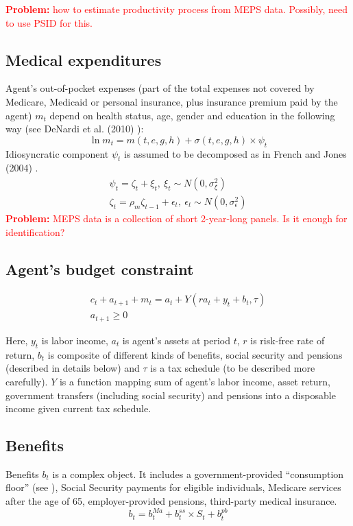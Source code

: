 \documentclass[
10pt, %
a4paper, %
oneside, %
headinclude,footinclude, %
BCOR5mm, %
]{scrartcl}
\begin{document}
 \textcolor{red}{\textbf{Problem:} how to estimate productivity process from MEPS data. Possibly, need to use PSID for this.}

\subsection{Medical expenditures}
Agent's out-of-pocket expenses (part of the total expenses not covered by Medicare, Medicaid or personal insurance, plus insurance premium paid by the agent) $m_t$ depend on health status, age, gender and education in the following way (see DeNardi et al. (2010) \cite{DeNardi2010}):
\begin{equation*}
\ln m_t = m(t,e,g,h) + \sigma(t,e,g,h)\times \psi_t 
\end{equation*}
Idiosyncratic component $\psi_t$ is assumed to be decomposed as in French and Jones (2004) \cite{French2004}.
\begin{eqnarray*}
\psi_t = \zeta_t + \xi_t, \   	\xi_t \sim N(0,\sigma_\xi^2) \\
\zeta_t = \rho_m\zeta_{t-1} + \epsilon_t, \   \epsilon_t \sim N(0,\sigma_\epsilon^2)
\end{eqnarray*}
 \textcolor{red}{\textbf{Problem:} MEPS data is a collection of short 2-year-long panels. Is it enough for identification?}

\subsection{Agent's budget constraint}

\begin{eqnarray*}
c_t + a_{t+1} +m_t = a_t+Y(ra_t+y_t+b_t,\tau)  \\
a_{t+1}\ge0
\end{eqnarray*}

Here, $y_t$ is labor income, $a_t$ is agent's assets at period $t$, $r$ is risk-free rate of return, $b_t$ is composite of different kinds of benefits, social security and pensions (described in details below) and $\tau$ is a tax schedule (to be described more carefully).  $Y$ is a function mapping sum of agent's labor income, asset return, government transfers (including social security) and pensions into a disposable income given current tax schedule.

\subsection{Benefits}
Benefits $b_t$ is a complex object. It includes a government-provided ``consumption floor'' (see \cite{DeNardi2010}), Social Security payments for eligible individuals, Medicare services after the age of 65, employer-provided pensions, third-party medical insurance.
\begin{equation*}
b_t = b_t^{Ma} + b_t^{ss}\times S_t+b_t^{pb}
\end{equation*}
\end{document}
